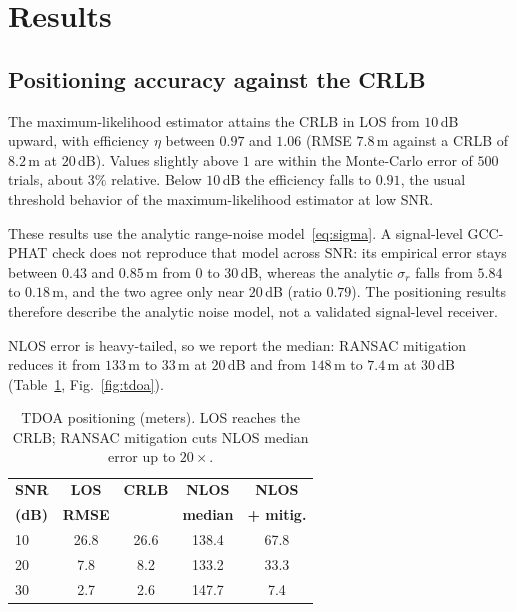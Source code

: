 \documentclass[journal]{IEEEtran}
\begin{document}
\section{Results}\label{sec:results}
\subsection{Positioning accuracy against the CRLB}
The maximum-likelihood estimator attains the CRLB in LOS from $10$\,dB upward,
with efficiency $\eta$ between $0.97$ and $1.06$ (RMSE $7.8$\,m against a CRLB
of $8.2$\,m at $20$\,dB). Values slightly above $1$ are within the Monte-Carlo
error of $500$ trials, about $3\%$ relative. Below $10$\,dB the efficiency
falls to $0.91$, the usual threshold behavior of the maximum-likelihood
estimator at low SNR.

These results use the analytic range-noise model~\eqref{eq:sigma}. A
signal-level GCC-PHAT check does not reproduce that model across SNR: its
empirical error stays between $0.43$ and $0.85$\,m from $0$ to $30$\,dB,
whereas the analytic $\sigma_r$ falls from $5.84$ to $0.18$\,m, and the two
agree only near $20$\,dB (ratio $0.79$). The positioning results therefore
describe the analytic noise model, not a validated signal-level receiver.

NLOS error is heavy-tailed, so we
report the median: RANSAC mitigation reduces it from $133$\,m to $33$\,m at
$20$\,dB and from $148$\,m to $7.4$\,m at $30$\,dB (Table~\ref{tab:tdoa},
Fig.~\ref{fig:tdoa}).

\begin{table}[t]\centering
\caption{TDOA positioning (meters). LOS reaches the CRLB; RANSAC mitigation
cuts NLOS median error up to $20\times$.}\label{tab:tdoa}\small
\begin{tabular}{lcccc}\toprule
\textbf{SNR} & \textbf{LOS} & \textbf{CRLB} & \textbf{NLOS} & \textbf{NLOS} \\
\textbf{(dB)} & \textbf{RMSE} & & \textbf{median} & \textbf{+ mitig.} \\ \midrule
10 & 26.8 & 26.6 & 138.4 & 67.8 \\
20 & \phantom{0}7.8 & \phantom{0}8.2 & 133.2 & 33.3 \\
30 & \phantom{0}2.7 & \phantom{0}2.6 & 147.7 & \phantom{0}7.4 \\ \bottomrule
\end{tabular}
\end{table}
\end{document}
